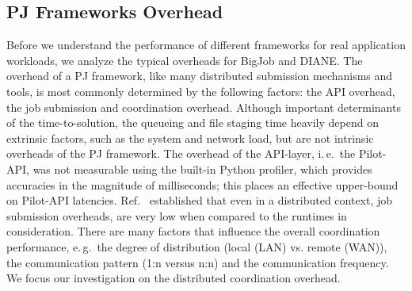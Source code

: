 \documentclass[conference]{IEEEtran}
\begin{document}








\subsection{PJ Frameworks Overhead}\label{sec:pj_performance}

Before we understand the performance of different frameworks for real
application workloads, we analyze the typical overheads for BigJob and
DIANE.  The overhead of a PJ framework, like many distributed
submission mechanisms and tools, is most commonly determined by the
following factors: the API overhead, the job submission and
coordination overhead. Although important determinants of the
time-to-solution, the queueing and file staging time heavily depend on
extrinsic factors, such as the system and network load, but are not
intrinsic overheads of the PJ framework. The overhead of the
API-layer, i.\,e.\ the Pilot-API, was not measurable using the
built-in Python profiler, which provides accuracies in the magnitude
of milliseconds; this places an effective upper-bound on Pilot-API
latencies. Ref.~\cite{saga_europar10} established that even in a
distributed context, job submission overheads, are very low when
compared to the runtimes in consideration.  There are many factors
that influence the overall coordination performance, e.\,g.\ the
degree of distribution (local (LAN) vs. remote (WAN)), the
communication pattern (1:n versus n:n) and the communication
frequency. We focus our investigation on the distributed coordination
overhead.
\end{document}
